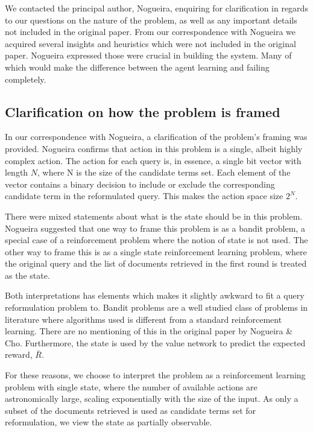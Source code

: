 We contacted the principal author, Nogueira, enquiring for clarification in regards to our questions on the nature of the problem, as well as any important details not included in the original paper. From our correspondence with Nogueira we acquired several insights and heuristics which were not included in the original paper. Nogueira expressed those were crucial in building the system. Many of which would make the difference between the agent learning and failing completely. 


\subsection{Clarification on how the problem is framed}

In our correspondence with Nogueira, a clarification of the problem’s framing was provided. Nogueira confirms that action in this problem is a single, albeit highly complex action.  The action for each query is, in essence, a single bit vector with length $N$, where N is the size of the candidate terms set. Each element of the vector contains a binary decision to include or exclude the corresponding candidate term in the reformulated query. This makes the action space size $2^{N}$.

There were mixed statements about what is the state should be in this problem. Nogueira suggested that one way to frame this problem is as a bandit problem, a special case of a reinforcement problem where the notion of state is not used. The other way to frame this is as a single state reinforcement learning problem, where the original query and the list of documents retrieved in the first round is treated as the state.

Both interpretations has elements which makes it slightly awkward to fit a query reformulation problem to. Bandit problems are a well studied class of problems in literature where algorithms used is different from a standard reinforcement learning. There are no mentioning of this in the original paper by Nogueira \& Cho\cite{nogueira2017task}. Furthermore, the state is used by the value network to predict the expected reward, $\bar{R}$. 

For these reasons, we choose to interpret the problem as a reinforcement learning problem with single state, where the number of available actions are astronomically large, scaling exponentially with the size of the input.  As only a subset of the documents retrieved is used as candidate terms set for reformulation, we view the state as partially observable. 

